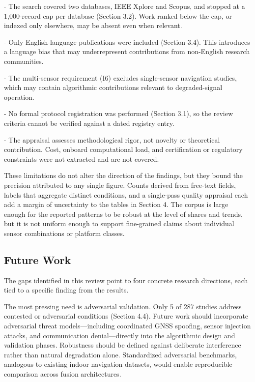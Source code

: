 \documentclass[conference]{IEEEtran}
\begin{document}
- The search covered two databases, IEEE Xplore and Scopus, and stopped at a 1,000-record cap per database (Section 3.2). Work ranked below the cap, or indexed only elsewhere, may be absent even when relevant.

- Only English-language publications were included (Section 3.4). This introduces a language bias that may underrepresent contributions from non-English research communities.

- The multi-sensor requirement (I6) excludes single-sensor navigation studies, which may contain algorithmic contributions relevant to degraded-signal operation.

- No formal protocol registration was performed (Section 3.1), so the review criteria cannot be verified against a dated registry entry.

- The appraisal assesses methodological rigor, not novelty or theoretical contribution. Cost, onboard computational load, and certification or regulatory constraints were not extracted and are not covered.


These limitations do not alter the direction of the findings, but they bound the precision attributed to any single figure. Counts derived from free-text fields, labels that aggregate distinct conditions, and a single-pass quality appraisal each add a margin of uncertainty to the tables in Section 4. The corpus is large enough for the reported patterns to be robust at the level of shares and trends, but it is not uniform enough to support fine-grained claims about individual sensor combinations or platform classes.


\subsection{Future Work}


The gaps identified in this review point to four concrete research directions, each tied to a specific finding from the results.


The most pressing need is adversarial validation. Only 5 of 287 studies address contested or adversarial conditions (Section 4.4). Future work should incorporate adversarial threat models—including coordinated GNSS spoofing, sensor injection attacks, and communication denial—directly into the algorithmic design and validation phases. Robustness should be defined against deliberate interference rather than natural degradation alone. Standardized adversarial benchmarks, analogous to existing indoor navigation datasets, would enable reproducible comparison across fusion architectures.
\end{document}
